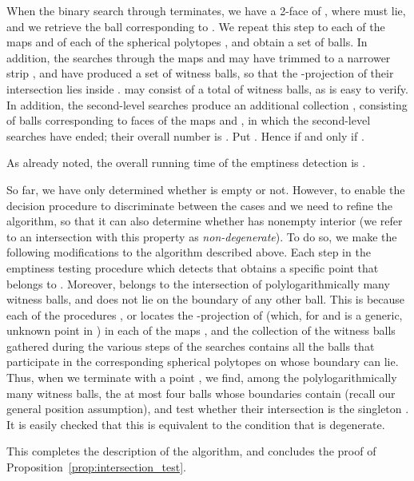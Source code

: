\documentclass[a4paper,12pt]{article}
\begin{document}
When the binary search through  terminates, we have a 2-face
 of , where  must lie, and we retrieve the ball
 corresponding to . We repeat this step to each of the
maps  and  of each of the  spherical polytopes
, and obtain a set  of  balls. In addition, the
searches through the maps  and  may have trimmed
 to a narrower strip , and have produced a set 
of witness balls, so that the -projection of their intersection
lies inside .  may consist of a total of  witness balls, as is easy to verify. In addition, the
second-level searches produce an additional collection ,
consisting of balls corresponding to faces of the maps  and
, in which the second-level searches have ended; their
overall number is . Put . Hence  if and only if .

As already noted, the overall running time of the emptiness
detection is .

So far, we have only determined whether  is empty or not.
However, to enable the decision procedure to discriminate between
the cases  and  we need to refine the algorithm,
so that it can also determine whether  has nonempty interior (we
refer to an intersection  with this property as
\emph{non-degenerate}).  To do so, we make the following
modifications to the algorithm described above. Each step in the
emptiness testing procedure which detects that 
obtains a specific point  that belongs to . Moreover, 
belongs to the intersection  of polylogarithmically many
witness balls, and does not lie on the boundary of any other ball.
This is because each of the procedures , or 
locates the -projection  of  (which, for  and
 is a generic, unknown point in ) in each of the maps
, and the collection of the witness
balls gathered during the various steps of the searches contains all
the balls that participate in the corresponding spherical polytopes
 on whose boundary  can lie. Thus, when we terminate with a
point , we find, among the polylogarithmically many witness
balls, the at most four balls whose boundaries contain  (recall
our general position assumption), and test whether their
intersection is the singleton . It is easily checked that
this is equivalent to the condition that  is degenerate.

This completes the description of the algorithm, and concludes the
proof of Proposition~\ref{prop:intersection_test}.
\end{document}
